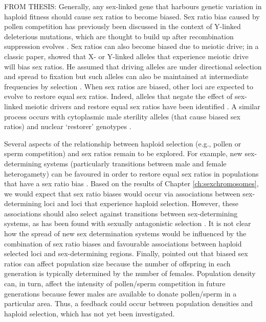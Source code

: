 \documentclass[12pt]{article}
\begin{document}
{\color{blue}
FROM THESIS:
Generally, any sex-linked gene that harbours genetic variation in haploid fitness should cause sex ratios to become biased. 
Sex ratio bias caused by pollen competition has previously been discussed in the context of Y-linked deleterious mutations, which are thought to build up after recombination suppression evolves \citep{Lloyd:1974tz,Stehlik:2005ul}. 
Sex ratios can also become biased due to meiotic drive;
in a classic paper, \citet{Hamilton:1967ts} showed that X- or Y-linked alleles that experience meiotic drive will bias sex ratios. 
He assumed that driving alleles are under directional selection and spread to fixation but such alleles can also be maintained at intermediate frequencies by selection \citep{Feldman:1989gm,Holman:2015en}. 
When sex ratios are biased, other loci are expected to evolve to restore equal sex ratios. 
Indeed, alleles that negate the effect of sex-linked meiotic drivers and restore equal sex ratios have been identified \citep{Stalker:1961th,Smith:1975ft}. 
A similar process occurs with cytoplasmic male sterility alleles (that cause biased sex ratios) and nuclear `restorer' genotypes \citep{Frank:1989vl}. 

Several aspects of the relationship between haploid selection (e.g., pollen or sperm competition) and sex ratios remain to be explored. 
For example, new sex-determining systems (particularly transitions between male and female heterogamety) can be favoured in order to restore equal sex ratios in populations that have a sex ratio bias \citep{Bull:1983vi,Kozielska:2010vm,Ubeda:2015fx}.
Based on the results of Chapter \ref{ch:sexchromosomes}, we would expect that sex ratio biases would occur via associations between sex-determining loci and loci that experience haploid selection. 
However, these associations should also select against transitions between sex-determining systems, as has been found with sexually antagonistic selection \citep{vanDoorn:2007eu,vanDoorn:2010hu}. 
It is not clear how the spread of new sex determination systems would be influenced by the combination of sex ratio biases and favourable associations between haploid selected loci and sex-determining regions. 
Finally, \citet{Hamilton:1967ts} pointed out that biased sex ratios can affect population size because the number of offspring in each generation is typically determined by the number of females. 
Population density can, in turn, affect the intensity of pollen/sperm competition in future generations because fewer males are available to donate pollen/sperm in a particular area. 
Thus, a feedback could occur between population densities and haploid selection, which has not yet been investigated. 
}






\end{document}
